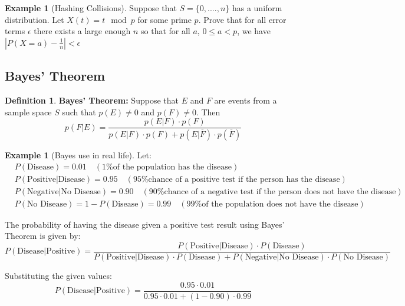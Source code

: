 \documentclass[letterpaper,10pt]{article}
\theoremstyle{plain}
\theoremstyle{definition}
\newtheorem{defn}[thm]{Definition}
\newtheorem{exmp}[thm]{Example}
\theoremstyle{remark}
\begin{document}
\begin{exmp}[Hashing Collisions]
Suppose that $S=\{0,....,n\}$ has a uniform distribution. 
\newline
Let $X(t)=t \mod p$ for some prime $p$.
\newline
Prove that for all error terms $\epsilon$ there exists a large enough $n$ so that for all $a$,
\newline
$0\leq a<p$, we have
\newline
$|P(X=a)-\frac{1}{n}|<\epsilon$
\newline
\vspace{2cm}
\newline
\end{exmp}
\subsection{Bayes' Theorem}
\begin{defn}
\textbf{Bayes' Theorem:} Suppose that \(E\) and \(F\) are events from a sample space \(S\) such that \(p(E) \neq 0\) and \(p(F) \neq 0\). Then
\[
p(F | E) = \frac{p(E | F) \cdot p(F)}{p(E | F) \cdot p(F) + p(E | \overline{F}) \cdot p(\overline{F})}
\]
\end{defn}
\begin{exmp}[Bayes use in real life]

Let:
\begin{align*}
& P(\text{Disease}) = 0.01 \quad (\text{1\% of the population has the disease}) \\
& P(\text{Positive} | \text{Disease}) = 0.95 \quad (\text{95\% chance of a positive test if the person has the disease}) \\
& P(\text{Negative} | \text{No Disease}) = 0.90 \quad (\text{90\% chance of a negative test if the person does not have the disease}) \\
& P(\text{No Disease}) = 1 - P(\text{Disease}) = 0.99 \quad (\text{99\% of the population does not have the disease})
\end{align*}

The probability of having the disease given a positive test result using Bayes' Theorem is given by:
\[
P(\text{Disease} | \text{Positive}) = \frac{P(\text{Positive} |\text{Disease}) \cdot P(\text{Disease})}{P(\text{Positive} | \text{Disease}) \cdot P(\text{Disease}) + P(\text{Negative} | \text{No Disease}) \cdot P(\text{No Disease})}
\]

Substituting the given values:
\[
P(\text{Disease} | \text{Positive}) = \frac{0.95 \cdot 0.01}{0.95 \cdot 0.01 + (1 - 0.90) \cdot 0.99}
\]

\end{exmp}
\end{document}
